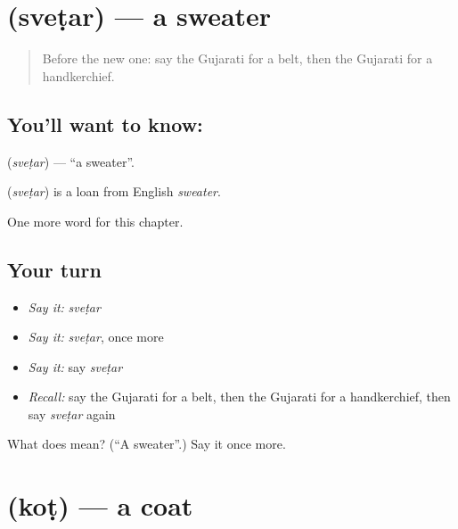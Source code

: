 \section[\texorpdfstring{\gu{સ્વેટર} (sveṭar)}{સ્વેટર (sveṭar)}]{ (sveṭar) — a sweater}

\label{lesson:GU-C112-svetar}



\begin{quote}
Before the new one: say the Gujarati for a belt, then the Gujarati for a handkerchief.
\end{quote}

\subsection*{You'll want to know: }
\textbf{} (\emph{sveṭar}) — \textquotedblleft{}a sweater\textquotedblright{}.

\begin{cousinweb}
\textbf{} (\emph{sveṭar}) is a loan from English \emph{sweater}.
\end{cousinweb}

\begin{grammarlens}[title={What you've built}]
One more word for this chapter.
\end{grammarlens}

\subsection*{Your turn}
\begin{itemize}
\raggedright
  \item \emph{Say it:} \emph{sveṭar}
  \item \emph{Say it:} \emph{sveṭar}, once more
  \item \emph{Say it:} say \emph{sveṭar}
  \item \emph{Recall:} say the Gujarati for a belt, then the Gujarati for a handkerchief, then say \emph{sveṭar} again
\end{itemize}

\begin{tcolorbox}[breakable,colback=teal!4,colframe=teal!35!black,title={Before you move on}]
What does  mean? (\textquotedblleft{}A sweater\textquotedblright{}.) Say it once more.
\end{tcolorbox}
\section[\texorpdfstring{\gu{કોટ} (koṭ)}{કોટ (koṭ)}]{ (koṭ) — a coat}

